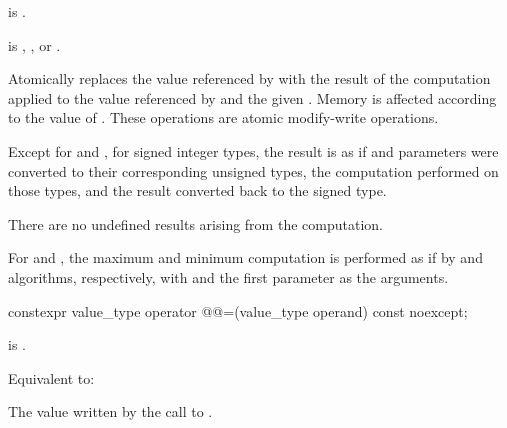 \begin{itemdescr}
\pnum
\constraints
{} is .

\pnum
\expects
{} is ,
, or
.

\pnum
\effects
Atomically replaces the value referenced by 
with the result of the computation applied to
the value referenced by  and the given .
Memory is affected according to the value of .
These operations are atomic modify-write operations.

\pnum
\remarks
Except for  and ,
for signed integer types,
the result is as if  and parameters
were converted to their corresponding unsigned types,
the computation performed on those types, and
the result converted back to the signed type.
\begin{note}
There are no undefined results arising from the computation.
\end{note}
For  and ,
the maximum and minimum computation is performed
as if by  and  algorithms, respectively,
with  and the first parameter as the arguments.
\end{itemdescr}

%
%
%
%
%
\begin{itemdecl}
constexpr value_type operator @@=(value_type operand) const noexcept;
\end{itemdecl}

\begin{itemdescr}
\pnum
\constraints
{} is .

\pnum
\effects
Equivalent to:

\pnum
\returns
The value written by the call to .
\end{itemdescr}

